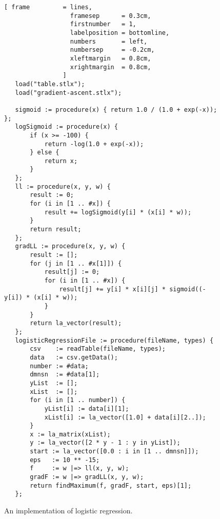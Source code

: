 \begin{figure}[!ht]
\centering
\begin{Verbatim}[ frame         = lines, 
                  framesep      = 0.3cm, 
                  firstnumber   = 1,
                  labelposition = bottomline,
                  numbers       = left,
                  numbersep     = -0.2cm,
                  xleftmargin   = 0.8cm,
                  xrightmargin  = 0.8cm,
                ]
   load("table.stlx");
   load("gradient-ascent.stlx");
   
   sigmoid := procedure(x) { return 1.0 / (1.0 + exp(-x)); };
   logSigmoid := procedure(x) {
       if (x >= -100) {
           return -log(1.0 + exp(-x));
       } else {  
           return x;
       }
   };
   ll := procedure(x, y, w) {
       result := 0;
       for (i in [1 .. #x]) {
           result += logSigmoid(y[i] * (x[i] * w));
       }
       return result;
   };   
   gradLL := procedure(x, y, w) {
       result := [];
       for (j in [1 .. #x[1]]) {
           result[j] := 0;
           for (i in [1 .. #x]) {
               result[j] += y[i] * x[i][j] * sigmoid((-y[i]) * (x[i] * w));
           }
       }
       return la_vector(result);
   };
   logisticRegressionFile := procedure(fileName, types) {
       csv    := readTable(fileName, types);
       data   := csv.getData();
       number := #data;
       dmnsn  := #data[1];    
       yList  := [];
       xList  := [];
       for (i in [1 .. number]) {
           yList[i] := data[i][1];
           xList[i] := la_vector([1.0] + data[i][2..]);
       }
       x := la_matrix(xList);
       y := la_vector([2 * y - 1 : y in yList]);
       start := la_vector([0.0 : i in [1 .. dmnsn]]);
       eps   := 10 ** -15;
       f     := w |=> ll(x, y, w);
       gradF := w |=> gradLL(x, y, w);
       return findMaximum(f, gradF, start, eps)[1];
   };
\end{Verbatim}
\vspace*{-0.3cm}
\caption{An implementation of logistic regression.}
\label{fig:logistic-regression.stlx}
\end{figure}

